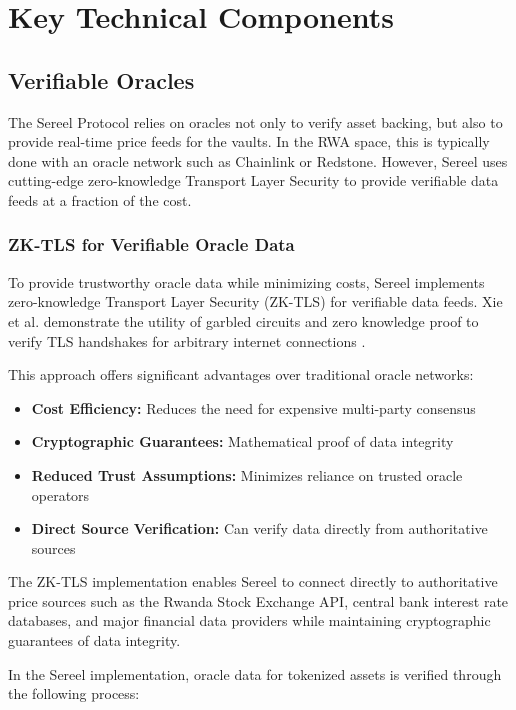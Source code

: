 \documentclass[12pt]{article}
\begin{document}
\section{Key Technical Components}

\subsection{Verifiable Oracles}
The Sereel Protocol relies on oracles not only to verify asset backing, but also to provide real-time price feeds for the vaults. In the RWA space, this is typically done with an oracle network such as Chainlink or Redstone. However, Sereel uses cutting-edge zero-knowledge Transport Layer Security to provide verifiable data feeds at a fraction of the cost. 

\subsubsection{ZK-TLS for Verifiable Oracle Data}
To provide trustworthy oracle data while minimizing costs, Sereel implements zero-knowledge Transport Layer Security (ZK-TLS) for verifiable data feeds. Xie et al. demonstrate the utility of garbled circuits and zero knowledge proof to verify TLS handshakes for arbitrary internet connections \cite{xie2023zktls}.

This approach offers significant advantages over traditional oracle networks:

\begin{itemize}
  \item \textbf{Cost Efficiency:} Reduces the need for expensive multi-party consensus
  \item \textbf{Cryptographic Guarantees:} Mathematical proof of data integrity
  \item \textbf{Reduced Trust Assumptions:} Minimizes reliance on trusted oracle operators
  \item \textbf{Direct Source Verification:} Can verify data directly from authoritative sources
\end{itemize}

The ZK-TLS implementation enables Sereel to connect directly to authoritative price sources such as the Rwanda Stock Exchange API, central bank interest rate databases, and major financial data providers while maintaining cryptographic guarantees of data integrity.

In the Sereel implementation, oracle data for tokenized assets is verified through the following process:
\end{document}
